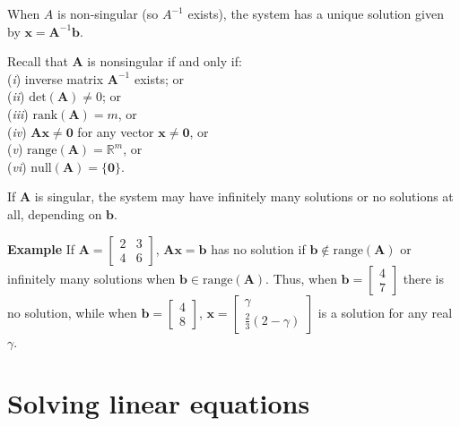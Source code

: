 When $A$ is non-singular (so $A^{-1}$ exists), the system has a unique solution given by $\mathbf x = \mathbf A^{-1}\mathbf b$.

 Recall that $\mathbf{A}$ is  nonsingular if and only if:\\ 
\hspace*{33mm} ({\em i})  inverse matrix $\mathbf{A}^{-1}$ exists; or \\
\hspace*{33mm} ({\em ii}) $\mathrm{det}(\mathbf{A})\ne 0$; or\\
\hspace*{33mm} ({\em iii})  $\mathrm{rank}(\mathbf{A})=m$, or \\
\hspace*{33mm} ({\em iv}) $\mathbf{Ax}\ne\mathbf{0}$ for any vector $\mathbf{x}\ne \mathbf{0}$, or\\
\hspace*{33mm} ({\em v}) $\mathrm{range}(\mathbf{A}) = \mathbb{R}^m$, or \\
\hspace*{33mm} ({\em vi}) $\mathrm{null}(\mathbf{A})=\{\mathbf{0}\}$.

If $\mathbf A$ is singular, the system may have infinitely many solutions or no solutions at all, depending on $\mathbf b$.

{\bf Example} If $\mathbf A = \left[\begin{array}{rr}2&3\\4&6\end{array}\right]$, $\mathbf{Ax} = \mathbf b$ has no solution if $\mathbf b \notin \mathrm{range}(\mathbf{A})$ or infinitely  many solutions when $\mathbf b \in \mathrm{range}(\mathbf{A})$.  Thus, when $\mathbf b = \left[\begin{array}{r}4\\7\end{array}\right]$ there is no solution, while when $\mathbf b = \left[\begin{array}{r}4\\8\end{array}\right]$, $\mathbf{x}=\left[ \begin{array}{c}\gamma\\\frac{2}{3}(2-\gamma)\end{array}\right]$ is a solution for any real $\gamma$. \sqend


\section{Solving linear equations}

